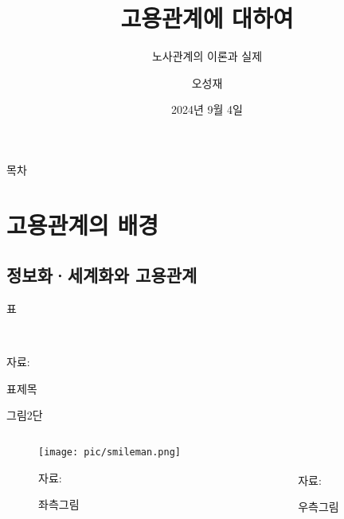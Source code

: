 \documentclass[aspectratio=169,xcolor=dvipsnames,presentation]{beamer}
\title[]{고용관계에 대하여} %
\subtitle{노사관계의 이론과 실제}
\author[]{오성재}
\institute[CNU] %
{%
    충남대학교 경제학과\\
}
\date{2024년 9월 4일} %
\begin{document}
\begin{frame}
    \titlepage%
\end{frame}

\begin{frame}{목차}
    \tableofcontents[hideallsubsections]
\end{frame}

\section{고용관계의 배경}

\subsection{정보화·세계화와 고용관계}

\begin{frame}{표}
    \scriptsize
    \begin{table}
        \centering
        \resizebox{.6\textwidth}{!}{%
            
        }
        \\
        \raggedright %
        \hspace{1em} %
        \tiny{자료:} %
        \caption{표제목}
    \end{table}
\end{frame}

\begin{frame}{그림2단}
\begin{columns}
    \begin{column}{.5\textwidth}
        \begin{figure}
            \centering
            \texttt{[image: pic/smileman.png]}
            \\
            \raggedright %
            \hspace{1em} %
            \tiny{자료: } %
            \caption{좌측그림}
        \end{figure}
    \end{column}
    \begin{column}{.5\textwidth}
        \begin{figure}
            \centering
            \\
            \raggedright %
            \hspace{1em} %
            \tiny{자료:} %
            \caption{우측그림}
        \end{figure}
    \end{column}
\end{columns}
\end{frame}
\end{document}
